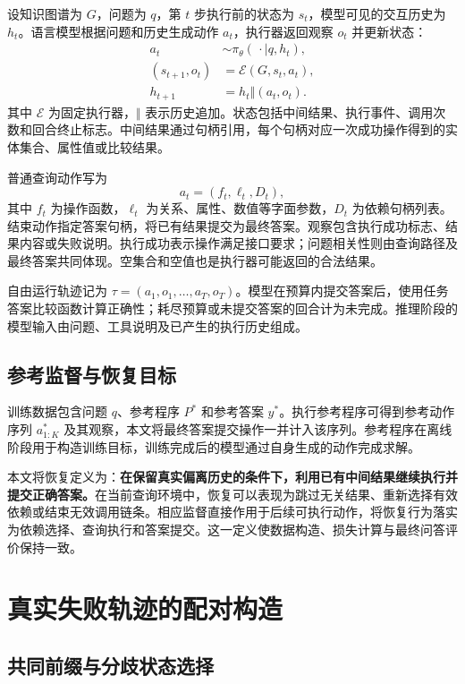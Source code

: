 设知识图谱为 $G$，问题为 $q$，第 $t$ 步执行前的状态为 $s_t$，模型可见的交互历史为 $h_t$。语言模型根据问题和历史生成动作 $a_t$，执行器返回观察 $o_t$ 并更新状态：
\begin{align}
  a_t &\sim \pi_\theta(\,\cdot\mid q,h_t), \\
  (s_{t+1},o_t) &= \mathcal{E}(G,s_t,a_t), \\
  h_{t+1} &= h_t\mathbin{\Vert}(a_t,o_t).
\end{align}
其中 $\mathcal{E}$ 为固定执行器，$\Vert$ 表示历史追加。状态包括中间结果、执行事件、调用次数和回合终止标志。中间结果通过句柄引用，每个句柄对应一次成功操作得到的实体集合、属性值或比较结果。

普通查询动作写为
\begin{equation}
  a_t=(f_t,\ell_t,D_t),
\end{equation}
其中 $f_t$ 为操作函数，$\ell_t$ 为关系、属性、数值等字面参数，$D_t$ 为依赖句柄列表。结束动作指定答案句柄，将已有结果提交为最终答案。观察包含执行成功标志、结果内容或失败说明。执行成功表示操作满足接口要求；问题相关性则由查询路径及最终答案共同体现。空集合和空值也是执行器可能返回的合法结果。

自由运行轨迹记为 $\tau=(a_1,o_1,\ldots,a_T,o_T)$。模型在预算内提交答案后，使用任务答案比较函数计算正确性；耗尽预算或未提交答案的回合计为未完成。推理阶段的模型输入由问题、工具说明及已产生的执行历史组成。

\subsection{参考监督与恢复目标}

训练数据包含问题 $q$、参考程序 $P^*$ 和参考答案 $y^*$。执行参考程序可得到参考动作序列 $a^*_{1:K}$ 及其观察，本文将最终答案提交操作一并计入该序列。参考程序在离线阶段用于构造训练目标，训练完成后的模型通过自身生成的动作完成求解。

本文将恢复定义为：\textbf{在保留真实偏离历史的条件下，利用已有中间结果继续执行并提交正确答案。}在当前查询环境中，恢复可以表现为跳过无关结果、重新选择有效依赖或结束无效调用链条。相应监督直接作用于后续可执行动作，将恢复行为落实为依赖选择、查询执行和答案提交。这一定义使数据构造、损失计算与最终问答评价保持一致。

\section{真实失败轨迹的配对构造}

\subsection{共同前缀与分歧状态选择}


